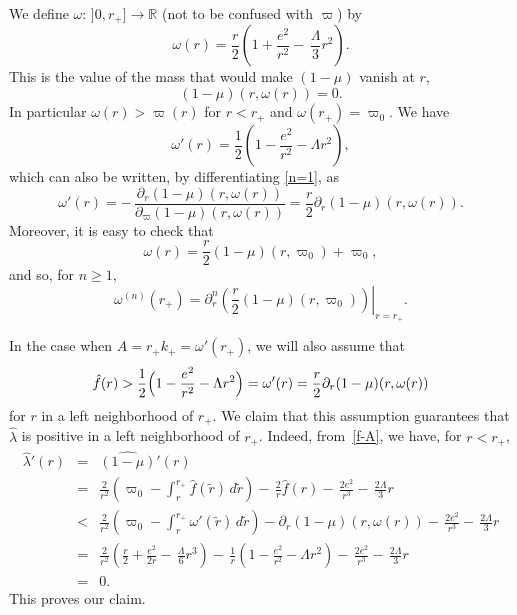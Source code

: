 \documentclass[a4paper,11pt,oneside,reqno]{amsart}
\newcommand{\kk}{k_+}
\newcommand{\R}{\mathbb{R}}
\begin{document}
We define $\omega:\,]0,r_+]\to\R$ (not to be confused with $\varpi$) by
$$
\omega(r)=\frac r2\left(1+\frac{e^2}{r^2}-\,\frac{\Lambda}{3}r^2\right).
$$
This is the value of the mass that would make $(1-\mu)$ vanish at $r$,
\begin{equation}\label{n=1}
(1-\mu)(r,\omega(r))=0.
\end{equation} 
In particular $\omega(r)>\varpi(r)$ for $r<r_+$ and $\omega(r_+) = \varpi_0$.
We have
$$
\omega'(r)=\frac{1}{2}\left(1-\frac{e^2}{r^2}-\Lambda r^2\right),
$$
which can also be written, by differentiating \eqref{n=1}, as
\begin{equation}\label{omega-linha}
\omega'(r)=-\,\frac{\partial_r(1-\mu)(r,\omega(r))}
{\partial_\varpi(1-\mu)(r,\omega(r))}=\frac{r}{2}\partial_r(1-\mu)(r,\omega(r)).
\end{equation}
Moreover, it is easy to check that
$$
\omega(r)=\frac{r}{2}(1-\mu)(r,\varpi_0)+\varpi_0,
$$
and so, for $n\geq 1$,
\begin{equation}\label{particular}
\omega^{(n)}(r_+)=\left.
\partial^n_r\left(\frac{r}{2}(1-\mu)(r,\varpi_0)\right)\right|_{r=r_+}.
\end{equation}

In the case when $A=r_+\kk=\omega'(r_+)$,
we will also assume that
\begin{equation}
\label{f-A}
\hat{f}(r)>\frac{1}{2}\Bigl(1-\frac{e^2}{r^2}-\Lambda r^2\Bigr)=
\omega'(r)=
\frac{r}{2}\partial_r(1-\mu)(r,\omega(r))
\end{equation}
for $r$ in a left neighborhood of $r_+$.
We claim that this assumption
guarantees that $\hat\lambda$ is positive in a left neighborhood of $r_+$.
Indeed, from~\eqref{f-A}, we have, for $r<r_+$,
\begin{eqnarray*}
\hat\lambda'(r)&=&\widehat{(1-\mu)}'(r) \\
&=&\frac{2}{r^2}
\left(\varpi_0-\int_r^{r_+}\hat{f}(\tilde r)\,d\tilde r\right) 
-\,\frac{2}{r}\hat{f}(r)-\,\frac{2e^2}{r^3}-\,\frac{2\Lambda}3r\\
&<&\frac{2}{r^2}
\left(\varpi_0-\int_r^{r_+}\omega'(\tilde r)\,d\tilde r\right)
-\partial_r(1-\mu)(r,\omega(r))-\,\frac{2e^2}{r^3}-\,\frac{2\Lambda}3r\\
&=&\frac{2}{r^2}
\left(\frac{r}{2}+\frac{e^2}{2r}-\,\frac{\Lambda}{6}r^3\right) 
-\,\frac{1}{r}\left(1-\frac{e^2}{r^2}-\Lambda r^2\right)-\,\frac{2e^2}{r^3}-\,\frac{2\Lambda}3r\\
&=&0.
\end{eqnarray*}
This proves our claim.
\end{document}
